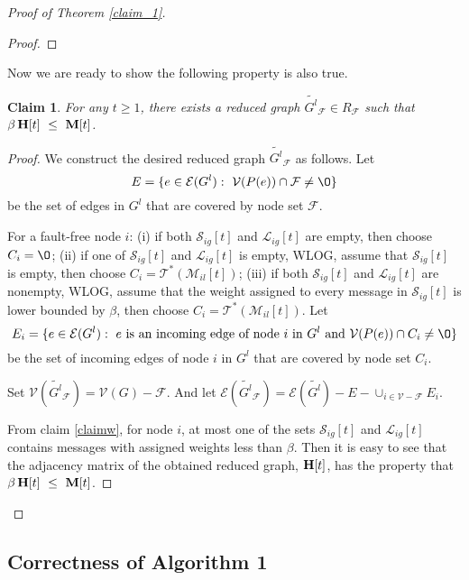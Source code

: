 \documentclass[letterpaper, 11pt]{article}
\newtheorem{claim}[theorem]{Claim}
\newcommand{\calE}{{\mathcal{E}}}
\newcommand{\calF}{{\mathcal{F}}}
\newcommand{\calL}{{\mathcal{L}}}
\newcommand{\calM}{{\mathcal{M}}}
\newcommand{\calS}{{\mathcal{S}}}
\newcommand{\calT}{{\mathcal{T}}}
\newcommand{\calV}{{\mathcal{V}}}
\begin{document}
\begin{proof}[Proof of Theorem \ref{claim_1}]
\begin{proof}
\end{proof}
Now we are ready to show the following property is also true.

\begin{claim}
\label{claimrg}
For any $t\geq 1$, there exists a reduced graph $\widetilde{G^l}_{\calF}\in R_\calF$ such that
$\beta \, {\bf{H}}[t] ~ \leq ~  {{\bf{M}}[t]}$.
\end{claim}
\begin{proof}
 We construct the desired reduced graph $\widetilde{G^l}_{\calF}$ as follows.
 Let
 \[
 E=\{e\in \calE(G^{l}):~\calV(P(e))\cap \calF\not=\O\}
 \]
  be the set of edges in $G^{l}$ that are covered by node set $\calF$.

For a fault-free node $i$: (i) if both $\calS_{ig}[t]$ and $\calL_{ig}[t]$ are empty, then choose $C_i=\O$; (ii) if one of $\calS_{ig}[t]$ and $\calL_{ig}[t]$ is empty, WLOG, assume that $\calS_{ig}[t]$ is empty, then choose $C_i=\calT^*(\calM_{il}[t])$; (iii) if both $\calS_{ig}[t]$ and $\calL_{ig}[t]$ are nonempty, WLOG, assume that the weight assigned to every message in $\calS_{ig}[t]$ is lower bounded by $\beta$, then choose $C_i=\calT^*(\calM_{il}[t])$. Let
\[
E_i=\{e\in \calE(G^{l}):~ e~\text{is an incoming edge of node $i$ in}~G^{l}~~ \text{and}~ \calV(P(e))\cap C_i\not=\O\}
\]
 be the set of incoming edges of node $i$ in $G^{l}$ that are covered by node set $C_i$.

Set $\calV(\widetilde{G^l}_{\calF})=\calV(G)-\calF$. And let $\calE(\widetilde{G^l}_{\calF})=\calE(\widetilde{G^l})-E-\cup_{i\in\calV-\calF}E_i$.

From claim \ref{claimw}, for node $i$, at most one of the sets $\calS_{ig}[t]$ and $\calL_{ig}[t]$ contains messages with assigned weights less than $\beta$. Then it is easy to see that the adjacency matrix of the obtained reduced graph, ${\bf{H}}[t]$, has the property that $ {\beta \,\bf{H}}[t] ~ \leq ~  {{\bf{M}}[t]}$.





\end{proof}

\end{proof}







\subsection{Correctness of Algorithm 1}\label{app:correctness}
\end{document}
